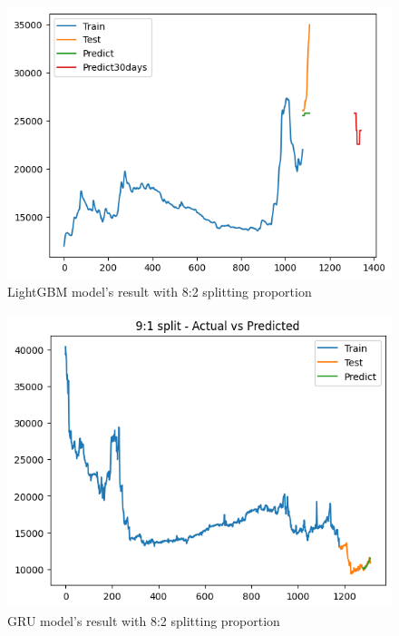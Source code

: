 \documentclass{ieeeojies}
\begin{document}
\begin{figure}[H]
  \centering
  \begin{minipage}{0.8\linewidth}
    \centering
    \includegraphics[width=\linewidth]{bibliography/Figure/LightGBM_DHT(8_2).png}
    \caption{LightGBM model's result with 8:2 splitting proportion}
    \label{fig8}
  \end{minipage}
\end{figure}

\begin{figure}[H]
  \centering
  \begin{minipage}{0.8\linewidth}
    \centering
    \includegraphics[width=\linewidth]{bibliography/Figure/DHT_GRU.png}
    \caption{GRU model's result with 8:2 splitting proportion}
    \label{fig8}
  \end{minipage}
\end{figure}
\end{document}
